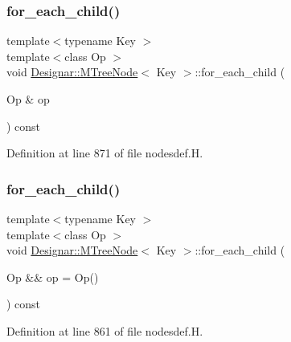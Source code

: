 \subsubsection{\texorpdfstring{for\+\_\+each\+\_\+child()}{for\_each\_child()}\hspace{0.1cm}{\footnotesize\ttfamily [1/2]}}
{\footnotesize\ttfamily template$<$typename Key $>$ \\
template$<$class Op $>$ \\
void \hyperlink{class_designar_1_1_m_tree_node}{Designar\+::\+M\+Tree\+Node}$<$ Key $>$\+::for\+\_\+each\+\_\+child (\begin{DoxyParamCaption}\item[{Op \&}]{op }\end{DoxyParamCaption}) const}



Definition at line 871 of file nodesdef.\+H.

\mbox{\label{class_designar_1_1_m_tree_node_a6cb0e3e0b246cd11dee5017a5058f0b1}} 
\subsubsection{\texorpdfstring{for\+\_\+each\+\_\+child()}{for\_each\_child()}\hspace{0.1cm}{\footnotesize\ttfamily [2/2]}}
{\footnotesize\ttfamily template$<$typename Key $>$ \\
template$<$class Op $>$ \\
void \hyperlink{class_designar_1_1_m_tree_node}{Designar\+::\+M\+Tree\+Node}$<$ Key $>$\+::for\+\_\+each\+\_\+child (\begin{DoxyParamCaption}\item[{Op \&\&}]{op = {\ttfamily Op()} }\end{DoxyParamCaption}) const\hspace{0.3cm}{\ttfamily [inline]}}



Definition at line 861 of file nodesdef.\+H.

\mbox{\label{class_designar_1_1_m_tree_node_a4e9b81f97d9f471a44e4fb84b1bb224b}} 
